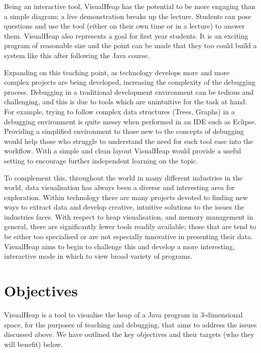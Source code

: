 \documentclass[11pt, a4paper]{report}
\begin{document}
Being an interactive tool, VisualHeap has the potential to be more engaging than a simple diagram; a live demonstration breaks up the lecture. Students can pose questions and use the tool (either on their own time or in a lecture) to answer them. VisualHeap also represents a goal for first year students. It is an exciting program of reasonable size and the point can be made that they too could build a system like this after following the Java course.

Expanding on this teaching point, as technology develops more and more complex projects are being developed, increasing the complexity of the debugging process. Debugging in a traditional development environment can be tedious and challenging, and this is due to tools which are unintuitive for the task at hand. For example, trying to follow complex data structures (Trees, Graphs) in a debugging environment is quite messy when performed in an IDE such as Eclipse. Providing a simplified environment to those new to the concepts of debugging would help those who struggle to understand the need for such tool ease into the workflow. With a simple and clean layout VisualHeap would provide a useful setting to encourage further independent learning on the topic. 

To complement this, throughout the world in many different industries in the world, data visualisation has always been a diverse and interesting area for exploration. Within technology there are many projects devoted to finding new ways to extract data and develop creative, intuitive solutions to the issues the industries faces. With respect to heap visualisation, and memory management in general, there are significantly fewer tools readily available; those that are tend to be either too specialised or are not especially innovative in presenting their data. VisualHeap aims to begin to challenge this and develop a more interesting, interactive mode in which to view broad variety of programs. 

\section{Objectives}

VisualHeap is a tool to visualise the heap of a Java program in 3-dimensional space, for the purposes of teaching and debugging, that aims to address the issues discussed above. We have  outlined the key objectives and their targets (who they will benefit) below.
\end{document}
